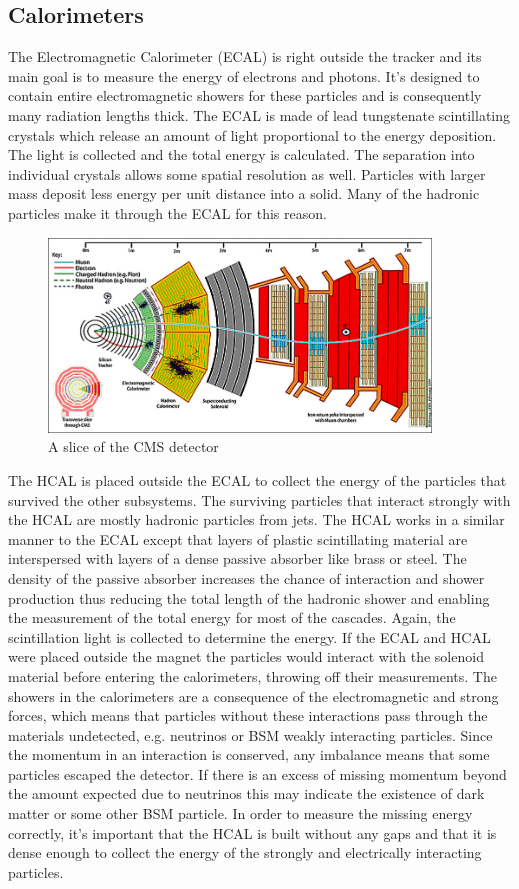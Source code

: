 \FloatBarrier
\subsection{Calorimeters}
The Electromagnetic Calorimeter (ECAL) is right outside the tracker and its main goal is to measure the energy of electrons and photons. It's designed to contain entire electromagnetic showers for these particles and is consequently many radiation lengths thick. The ECAL is made of lead tungstenate scintillating crystals which release an amount of light proportional to the energy deposition. The light is collected and the total energy is calculated. The separation into individual crystals allows some spatial resolution as well. Particles with larger mass deposit less energy per unit distance into a solid. Many of the hadronic particles make it through the ECAL for this reason.

\begin{figure}[h!]
  \centering
  \includegraphics[width=4in]{images/cms_slice.jpg}
  \caption
   {A slice of the CMS detector \cite{cmsweb}}
  \label{fig:cmsdetslice}
\end{figure}

The HCAL is placed outside the ECAL to collect the energy of the particles that survived the other subsystems. The surviving particles that interact strongly with the HCAL are mostly hadronic particles from jets. The HCAL works in a similar manner to the ECAL except that layers of plastic scintillating material are interspersed with layers of a dense passive absorber like brass or steel. The density of the passive absorber increases the chance of interaction and shower production thus reducing the total length of the hadronic shower and enabling the measurement of the total energy for most of the cascades. Again, the scintillation light is collected to determine the energy. If the ECAL and HCAL were placed outside the magnet the particles would interact with the solenoid material before entering the calorimeters, throwing off their measurements. The showers in the calorimeters are a consequence of the electromagnetic and strong forces, which means that particles without these interactions pass through the materials undetected, e.g. neutrinos or BSM weakly interacting particles. Since the momentum in an interaction is conserved, any imbalance means that some particles escaped the detector. If there is an excess of missing momentum beyond the amount expected due to neutrinos this may indicate the existence of dark matter or some other BSM particle. In order to measure the missing energy correctly, it's important that the HCAL is built without any gaps and that it is dense enough to collect the energy of the strongly and electrically interacting particles.

